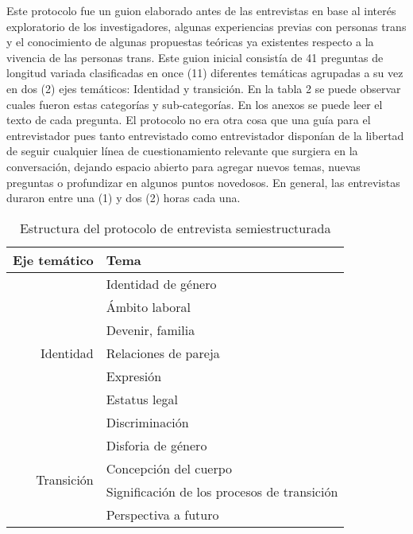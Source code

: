 Este protocolo fue un guion elaborado antes de las entrevistas en base al
interés exploratorio de los investigadores, algunas experiencias previas con
personas trans y el conocimiento de algunas propuestas teóricas ya existentes
respecto a la vivencia de las personas trans.
Este guion inicial consistía de 41 preguntas de longitud variada clasificadas en
once (11) diferentes temáticas agrupadas a su vez en dos (2) ejes temáticos:
Identidad y transición.
En la tabla 2 se puede observar cuales fueron estas categorías y sub-categorías.
En los anexos se puede leer el texto de cada pregunta.
El protocolo no era otra cosa que una guía para el entrevistador pues tanto
entrevistado como entrevistador disponían de la libertad de seguir cualquier
línea de cuestionamiento relevante que surgiera en la conversación, dejando
espacio abierto para agregar nuevos temas, nuevas preguntas o profundizar en
algunos puntos novedosos.
En general, las entrevistas duraron entre una (1) y dos (2) horas cada una.

\begin{table}[]
\centering
\caption{Estructura del protocolo de entrevista semiestructurada}
\label{tab:protocolo}
\begin{tabularx}{\textwidth}{@{}rX@{}}
\toprule
Eje temático                & Tema                                        \\ \midrule
\multirow{7}{*}{Identidad}  & Identidad de género                         \\
                            & Ámbito laboral                              \\
                            & Devenir, familia                            \\
                            & Relaciones de pareja                        \\
                            & Expresión                                   \\
                            & Estatus legal                               \\
                            & Discriminación                              \\
\midrule
\multirow{4}{*}{Transición} & Disforia de género                          \\
                            & Concepción del cuerpo                       \\
                            & Significación de los procesos de transición \\
                            & Perspectiva a futuro                        \\
\bottomrule
\end{tabularx}
\end{table}

